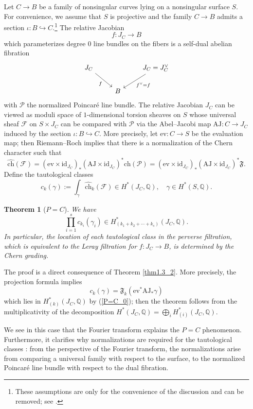 \documentclass[11pt]{amsart}
\theoremstyle{plain}
\newtheorem{thm}{Theorem}[section]
\theoremstyle{definition}
\theoremstyle{remark}
\newcommand{\BQ}{{\mathbb{Q}}}
\newcommand{\CF}{{\mathcal F}}
\newcommand{\CP}{{\mathcal P}}
\begin{document}
Let $C \to B$ be a family of nonsingular curves lying on a nonsingular surface $S$. For convenience, we assume that $S$ is projective and the family $C \to B$ admits a section \mbox{$\iota: B \hookrightarrow C$}.\footnote{These assumptions are only for the convenience of the discussion and can be removed; see \cite[Sections 4 and 5]{MSY}.}
The relative Jacobian 
\[
f: J_C \to B
\]
which parameterizes degree $0$ line bundles on the fibers is a self-dual abelian fibration
\begin{equation*}
\begin{tikzcd}
J_C \arrow[dr, "f"'] & & J_C = J_C^\vee \arrow[dl, "f^\vee =f"] \\
& B &
\end{tikzcd}
\end{equation*}
with $\CP$ the normalized Poincar\'e line bundle. The relative Jacobian $J_C$ can be viewed as moduli space of $1$-dimensional torsion sheaves on $S$ whose universal sheaf $\CF$ on $S\times J_C$ can be compared with $\CP$ via the Abel--Jacobi map $\mathrm{AJ}: C \to J_C$ induced by the section $\iota: B \hookrightarrow C$. More precisely, let $\mathrm{ev}: C \to S$ be the evaluation map; then Riemann--Roch implies that there is a normalization of the Chern character such that
\[
\widehat{\mathrm{ch}}(\CF) = (\mathrm{ev}\times \mathrm{id}_{J_C})_* (\mathrm{AJ}\times \mathrm{id}_{J_C})^*\mathrm{ch}(\CP) = (\mathrm{ev}\times \mathrm{id}_{J_C})_* (\mathrm{AJ}\times \mathrm{id}_{J_C})^*\mathfrak{F}.
\]
Define the tautological classes
\[
c_k(\gamma):= \int_{\gamma} \widehat{\mathrm{ch}}_k(\CF) \in H^*(J_C, \BQ), \quad \gamma \in H^*(S, \BQ).
\]

\begin{thm}[$P=C$]
    We have
    \[
    \prod_{i=1}^s c_{k_i}(\gamma_i) \in H^*_{(k_1+k_2+\cdots+k_s)}(J_C, \BQ).
    \]
    In particular, the location of each tautological class in the perverse filtration, which is equivalent to the Leray filtration for $f: J_C\to B$, is determined by the Chern grading.
\end{thm}

The proof is a direct consequence of Theorem \ref{thm1.3_2}. More precisely, the projection formula implies 
\[
c_k(\gamma) = \mathfrak{F}_k(\mathrm{ev}^*\mathrm{AJ}_*\gamma)
\]
which lies in $H^*_{(k)}(J_C, \BQ)$ by (\ref{P=C_0}); then the theorem follows from the multiplicativity of the decomposition $H^*(J_C, \BQ) = \bigoplus_{i} H^*_{(i)}(J_C, \BQ)$. 


We see in this case that the Fourier transform explains the $P=C$ phenomenon. Furthermore, it clarifies why normalizations are required for the tautological classes \cite{dCHM, KPS, KLMP}: from the perspective of the Fourier transform, the normalizations arise from comparing a universal family with respect to the surface, to the normalized Poincar\'e line bundle with respect to the dual fibration.
\end{document}
